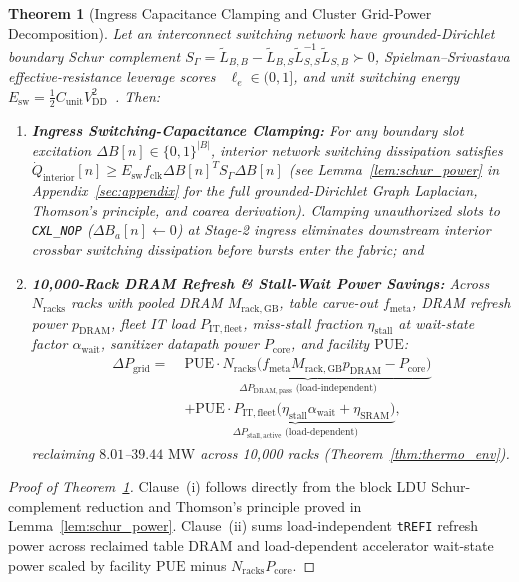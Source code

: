 \documentclass[11pt,letterpaper]{article}
\theoremstyle{spectralthm}
\newtheorem{theorem}{Theorem}[section]
\begin{document}
\begin{theorem}[Ingress Capacitance Clamping and Cluster Grid-Power Decomposition]
\label{thm:power}
Let an interconnect switching network have grounded-Dirichlet boundary Schur complement $S_\Gamma = \tilde{L}_{B,B} - \tilde{L}_{B,S}\tilde{L}_{S,S}^{-1}\tilde{L}_{S,B} \succ 0$, Spielman--Srivastava effective-resistance leverage scores~\cite{spielman2011graph} $\ell_e \in (0, 1]$, and unit switching energy $E_{\mathrm{sw}} = \frac{1}{2} C_{\mathrm{unit}} V_{\mathrm{DD}}^2$~\cite{1, thornton2026}. Then:
\begin{enumerate}
  \item[(i)] \textbf{Ingress Switching-Capacitance Clamping:} For any boundary slot excitation $\Delta B[n] \in \{0,1\}^{|B|}$, interior network switching dissipation satisfies $\dot{Q}_{\mathrm{interior}}[n] \ge E_{\mathrm{sw}} f_{\mathrm{clk}} \Delta B[n]^T S_\Gamma \Delta B[n]$ (see Lemma~\ref{lem:schur_power} in Appendix~\ref{sec:appendix} for the full grounded-Dirichlet Graph Laplacian, Thomson's principle, and coarea derivation). Clamping unauthorized slots to \texttt{CXL\_NOP} ($\Delta B_a[n] \leftarrow 0$) at Stage-2 ingress eliminates downstream interior crossbar switching dissipation before bursts enter the fabric; and
  \item[(ii)] \textbf{10,000-Rack DRAM Refresh \& Stall-Wait Power Savings:} Across $N_{\mathrm{racks}}$ racks with pooled DRAM $M_{\mathrm{rack,GB}}$, table carve-out $f_{\mathrm{meta}}$, DRAM refresh power $p_{\mathrm{DRAM}}$, fleet IT load $P_{\mathrm{IT,fleet}}$, miss-stall fraction $\eta_{\mathrm{stall}}$ at wait-state factor $\alpha_{\mathrm{wait}}$, sanitizer datapath power $P_{\mathrm{core}}$, and facility $\mathrm{PUE}$:
  \begin{equation}
  \label{eq:grid_power}
  \begin{aligned}
  \Delta P_{\mathrm{grid}} =\;& \underbrace{\mathrm{PUE} \cdot N_{\mathrm{racks}}\bigl(f_{\mathrm{meta}} M_{\mathrm{rack,GB}} p_{\mathrm{DRAM}} - P_{\mathrm{core}}\bigr)}_{\Delta P_{\mathrm{DRAM,pass}}\text{ (load-independent)}}\\
  &+ \underbrace{\mathrm{PUE} \cdot P_{\mathrm{IT,fleet}}\bigl(\eta_{\mathrm{stall}} \alpha_{\mathrm{wait}} + \eta_{\mathrm{SRAM}}\bigr)}_{\Delta P_{\mathrm{stall,active}}\text{ (load-dependent)}},
  \end{aligned}
  \end{equation}
  reclaiming $8.01$--$39.44\text{~MW}$ across 10,000 racks (Theorem~\ref{thm:thermo_env}).
\end{enumerate}
\end{theorem}
\begin{proof}[Proof of Theorem~\ref{thm:power}]
Clause~(i) follows directly from the block LDU Schur-complement reduction and Thomson's principle proved in Lemma~\ref{lem:schur_power}. Clause~(ii) sums load-independent \texttt{tREFI} refresh power across reclaimed table DRAM and load-dependent accelerator wait-state power scaled by facility $\mathrm{PUE}$ minus $N_{\mathrm{racks}} P_{\mathrm{core}}$.
\end{proof}
\end{document}
